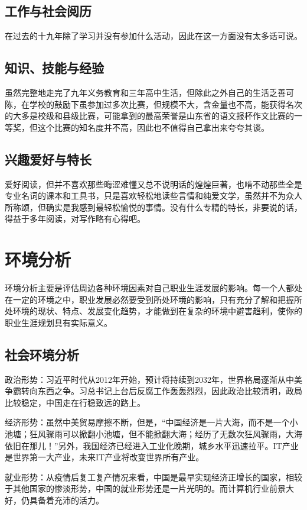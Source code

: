 \documentclass{article}
\begin{document}
\subsection{工作与社会阅历}
在过去的十九年除了学习并没有参加什么活动，因此在这一方面没有太多话可说。\par
\subsection{知识、技能与经验}
虽然完整地走完了九年义务教育和三年高中生活，但除此之外自己的生活乏善可陈，在学校的鼓励下虽参加过多次比赛，但规模不大，含金量也不高，能获得名次的大多是校级和县级比赛，可能拿到的最高荣誉是山东省的语文报杯作文比赛的一等奖，但这个比赛的知名度并不高，因此也不值得自己拿出来夸夸其谈。\par
\subsection{兴趣爱好与特长}
爱好阅读，但并不喜欢那些晦涩难懂又总不说明话的煌煌巨著，也啃不动那些全是专业名词的课本和工具书，只是喜欢轻松地读些言情和纯爱文学，虽然并不为众人所称颂，但确实是我感到最轻松愉悦的事情。没有什么专精的特长，非要说的话，得益于多年阅读，对写作略有心得吧。\par
\section{环境分析}
环境分析主要是评估周边各种环境因素对自己职业生涯发展的影响。每一个人都处在一定的环境之中，职业发展必然要受到所处环境的影响，只有充分了解和把握所处环境的现状、特点、发展变化趋势，才能做到在复杂的环境中避害趋利，使你的职业生涯规划具有实际意义。\par
\subsection{社会环境分析}
政治形势：习近平时代从2012年开始，预计将持续到2032年，世界格局逐渐从中美争霸转向东西之争。习总书记上台后反腐工作轰轰烈烈，因此政治比较清明，政局比较稳定，中国走在行稳致远的路上。\par
经济形势：虽然中美贸易摩擦不断，但是，“中国经济是一片大海，而不是一个小池塘；狂风骤雨可以掀翻小池塘，但不能掀翻大海；经历了无数次狂风骤雨，大海依旧在那儿！”另外，我国经济已经进入工业化晚期，城乡水平迅速拉平。IT产业是世界第一大产业，未来IT产业将改变世界所有产业。\par
就业形势：从疫情后复工复产情况来看，中国是最早实现经济正增长的国家，相较于其他国家的惨淡形势，中国的就业形势还是一片光明的。而计算机行业前景大好，仍具备着充沛的活力。\par
\end{document}
